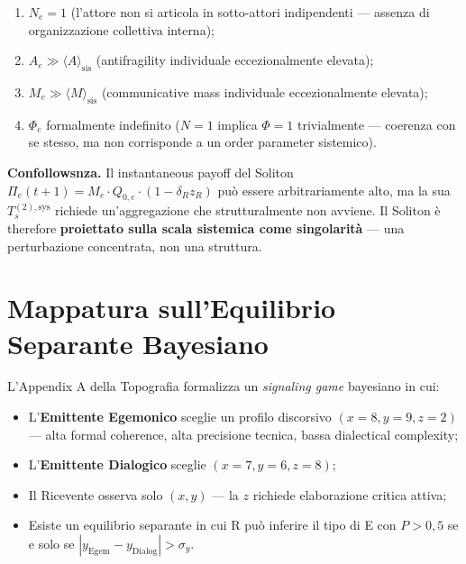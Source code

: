 \begin{enumerate}
\def\labelenumi{\arabic{enumi}.}
\tightlist
\item
  \(N_e = 1\) (l'attore non si articola in sotto-attori indipendenti ---
  assenza di organizzazione collettiva interna);
\item
  \(A_e \gg \langle A \rangle_{\text{sis}}\) (antifragility individuale
  eccezionalmente elevata);
\item
  \(M_e \gg \langle M \rangle_{\text{sis}}\) (communicative mass
  individuale eccezionalmente elevata);
\item
  \(\Phi_e\) formalmente indefinito (\(N=1\) implica \(\Phi = 1\)
  trivialmente --- coerenza con se stesso, ma non corrisponde a un
  order parameter sistemico).
\end{enumerate}

\Proved{} \textbf{Confollowsnza.} Il instantaneous payoff del Soliton
\(\Pi_e(t+1) = M_e \cdot Q_{0,e} \cdot (1 - \delta_R z_R)\) può essere
arbitrariamente alto, ma la sua \(T_s^{(2),\text{sys}}\) richiede
un'aggregazione che strutturalmente non avviene. Il Soliton è therefore
\textbf{proiettato sulla scala sistemica come singolarità} --- una
perturbazione concentrata, non una struttura.



\section{Mappatura sull'Equilibrio Separante
Bayesiano}\label{mappatura-sullequilibrio-separante-bayesiano}

L'Appendix A della Topografia formalizza un \emph{signaling game}
bayesiano in cui:

\begin{itemize}
\tightlist
\item
  L'\textbf{Emittente Egemonico} sceglie un profilo discorsivo
  \((x = 8, y = 9, z = 2)\) --- alta formal coherence, alta precisione
  tecnica, bassa dialectical complexity;
\item
  L'\textbf{Emittente Dialogico} sceglie \((x = 7, y = 6, z = 8)\);
\item
  Il Ricevente osserva solo \((x, y)\) --- la \(z\) richiede
  elaborazione critica attiva;
\item
  Esiste un equilibrio separante in cui R può inferire il tipo di E con
  \(P > 0{,}5\) se e solo se
  \(|y_{\text{Egem}} - y_{\text{Dialog}}| > \sigma_y\).
\end{itemize}

